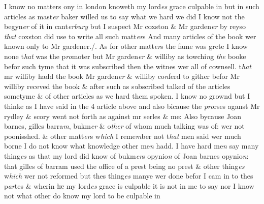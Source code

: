\documentclass[12pt, a4paper]{book}
\begin{document}
			 I know no matters ony in london knoweth my lord\textit{es} grace culpable in but  in such articles as mast\textit{er} baker willed us to say what we hard we did  
			 I know not the begyn\textit{er} of it in cant\textit{erbury} but I suspect Mr coxston \& Mr garden\textit{er} by  
				\marginpar[\vspace{0.5cm}{\textcolor{Gray}{1}}]{}
			 reyso \textit{that} coxston did use to write all such matt\textit{er}s And many articles of the  book wer known only to Mr gardener./. As for other matt\textit{er}s the fame was grete 
				\marginpar[\vspace{0.5cm}{\textcolor{Gray}{2}}]{}
			 I know none t\textit{hat} was the p\textit{ro}moter but Mr garden\textit{er} \& williby as towchi\textit{n}g \textit{the} booke 
			 befor such tyme that it was subscribed then the witnes wer all of cownsell. t\textit{hat} mr williby hadd the book Mr garden\textit{er} \& williby co\textit{n}ferd to gither befor Mr williby receved the book \& after  
				\marginpar[\vspace{0.5cm}{\textcolor{Gray}{3}}]{}
			 such as s\textit{u}bscribed talked of the articles sometyme \& of other articles as we  hard them spoken. I know no grownd but I thinke as I have said in the 4 article above and 
				\marginpar[\vspace{0.5cm}{\textcolor{Gray}{4}}]{}
			 also bicause the \textit{pro}rses aganst Mr rydley \& scory went not forth as against  mr serles \& me: Also bycause Joan barnes, gilles barra\textit{m}, bukm\textit{er} \& o\textit{ther} of whom much talking was of: wer not poonisshed. \& other matt\textit{er}s w\textit{hich} I reme\textit{m}ber not t\textit{hat} men said wer much borne 
				\marginpar[\vspace{0.5cm}{\textcolor{Gray}{5}}]{}
			 I do not know what knowledge other me\textit{n} hadd. 
				\marginpar[\vspace{0.5cm}{\textcolor{Gray}{n}}]{}
			 I have hard me\textit{n} say many thing\textit{es} as that my lord did know of bukm\textit{er}s opynio\textit{n} 
				\marginpar[\vspace{0.5cm}{\textcolor{Gray}{6}}]{}
			 of Joan barnes opynio\textit{n}: that gilles of barram used the office of a prest being no prest \& other thing\textit{es} w\textit{hich} wer not reformed but thes thing\textit{es} manye wer done befor I cam in to thes p\textit{ar}tes \& wherin \sout{he }my lord\textit{es} grace is culpable it is not in  me to say nor I know not what other do know my lord to be culpable in
\end{document}

